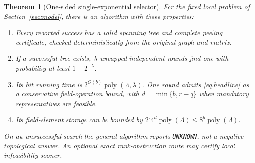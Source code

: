 \documentclass[11pt,letterpaper]{article}
\newtheorem{theorem}{Theorem}[section]
\theoremstyle{definition}
\newcommand{\poly}{\operatorname{poly}}
\newcommand{\Unk}{\texttt{UNKNOWN}}
\begin{document}
\begin{theorem}[One-sided single-exponential selector]\label{thm:main}
For the fixed local problem of Section~\ref{sec:model}, there is an algorithm
with these properties:
\begin{enumerate}[label=(\roman*)]
\item Every reported success has a valid spanning tree and complete peeling
certificate, checked deterministically from the original graph and matrix.
\item If a successful tree exists, $\lambda$ uncapped independent rounds
find one with probability at least $1-2^{-\lambda}$.
\item Its bit running time is $2^{O(b)}\poly(\Lambda,\lambda)$.
One round admits \eqref{eq:headline} as a conservative field-operation bound,
with $d=\min\{b,r-q\}$ when mandatory representatives are feasible.
\item Its field-element storage can be bounded by
$2^b4^d\poly(\Lambda)\leq8^b\poly(\Lambda)$.
\end{enumerate}
On an unsuccessful search the general algorithm reports \Unk, not a
negative topological answer. An optional exact rank-obstruction route may
certify local infeasibility sooner.
\end{theorem}
\end{document}
